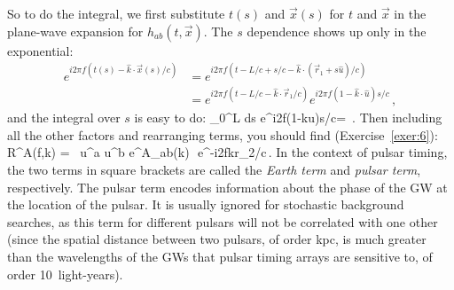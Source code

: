 So to do the integral, we first substitute $t(s)$ and 
$\vec x(s)$ for $t$ and $\vec x$ in the plane-wave 
expansion for $h_{ab}(t,\vec x)$.
The $s$ dependence shows up only in the exponential:
%
\begin{equation}
\begin{aligned}
e^{i2\pi f(t(s)-\hat k\cdot\vec x(s)/c)}
&= e^{i2\pi f(t-L/c + s/c -\hat k\cdot(\vec r_1 + s\hat u)/c)}
\\
&= e^{i2\pi f(t-L/c -\hat k\cdot\vec r_1/c)}
e^{i2\pi f(1 -\hat k\cdot\hat u)s/c}\,,
\end{aligned}
\end{equation}
%
and the integral over $s$ is easy to do:
%
\be
\int_0^L {\rm d}s\>
e^{i2\pi f(1-\hat k\cdot\hat u)s/c}=
\,.
\ee
Then including all the other factors and rearranging terms, 
you should find (Exercise~\ref{exer:6}):
%
\be
R^A(f,\hat k) = \,
u^a u^b e^A_{ab}(\hat k)\,
\,e^{-i2\pi f\hat k\cdot\vec r_2/c}\,.
\label{e:response_one_arm_one_way}
\ee
%
In the context of pulsar timing, the two terms in square brackets 
are called the {\em Earth term} and {\em pulsar term}, respectively.
The pulsar term encodes information about the phase of the GW at
the location of the pulsar.
It is usually ignored for stochastic background searches, as 
this term for different pulsars will not be correlated with one other
(since the spatial distance between two pulsars, of order kpc, 
is much greater than the wavelengths of the GWs that pulsar timing arrays are 
sensitive to, of order 10~light-years).

